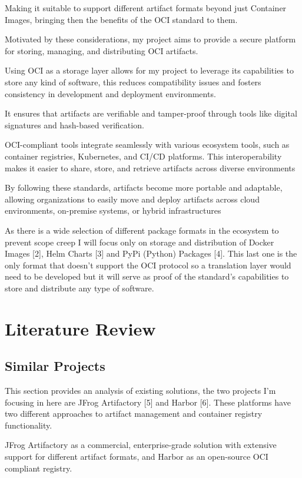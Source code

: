 \documentclass{article}
\begin{document}
  Making it suitable to support different artifact formats beyond just Container Images, bringing then the benefits of the OCI standard to them.

  Motivated by these considerations, my project aims to provide a secure platform for storing, managing, and distributing OCI artifacts.

  Using OCI as a storage layer allows for my project to leverage its capabilities to store any kind of software, this reduces compatibility issues and fosters consistency in development and deployment environments. 

  It ensures that artifacts are verifiable and tamper-proof through tools like digital signatures and hash-based verification.

  OCI-compliant tools integrate seamlessly with various ecosystem tools, such as container registries, Kubernetes, and CI/CD platforms. This interoperability makes it easier to share, store, and retrieve artifacts across diverse environments

  By following these standards, artifacts become more portable and adaptable, allowing organizations to easily move and deploy artifacts across cloud environments, on-premise systems, or hybrid infrastructures

  As there is a wide selection of different package formats in the ecosystem to prevent scope creep I will focus only on storage and distribution of Docker Images [2], Helm Charts [3] and PyPi (Python) Packages [4]. This last one is the only format that doesn't support the OCI protocol so a translation layer would need to be developed but it will serve as proof of the standard's capabilities to store and distribute any type of software.

  \section{Literature Review}

  \subsection{Similar Projects}

  This section provides an analysis of existing solutions, the two projects I'm focusing in here are JFrog Artifactory [5] and Harbor [6]. These platforms have two different approaches to artifact management and container registry functionality.
  
  JFrog Artifactory as a commercial, enterprise-grade solution with extensive support for different artifact formats, and Harbor as an open-source OCI compliant registry.
\end{document}
